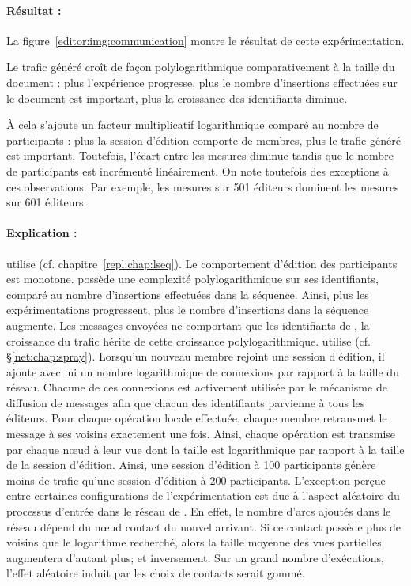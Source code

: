 \paragraph{Résultat :} La figure~\ref{editor:img:communication} montre le
résultat de cette expérimentation.
\begin{inparaenum}[(i)]
\item Le trafic généré croît de façon polylogarithmique comparativement à la
  taille du document : plus l'expérience progresse, plus le nombre d'insertions
  effectuées sur le document est important, plus la croissance des identifiants
  diminue.
\item À cela s'ajoute un facteur multiplicatif logarithmique comparé au nombre
  de participants : plus la session d'édition comporte de membres, plus le
  trafic généré est important. Toutefois, l'écart entre les mesures diminue
  tandis que le nombre de participants est incrémenté linéairement. On note
  toutefois des exceptions à ces observations. Par exemple, les mesures sur 501
  éditeurs dominent les mesures sur 601 éditeurs.
\end{inparaenum}

\paragraph{Explication :} \CRATE utilise \LSEQ
(cf. chapitre~\ref{repl:chap:lseq}). Le comportement d'édition des participants
est monotone. \LSEQ possède une complexité polylogarithmique sur ses
identifiants, comparé au nombre d'insertions effectuées dans la séquence. Ainsi,
plus les expérimentations progressent, plus le nombre d'insertions dans la
séquence augmente. Les messages envoyées ne comportant que les identifiants de
\LSEQ, la croissance du trafic hérite de cette croissance
polylogarithmique. \CRATE utilise \SPRAY (cf. §\ref{net:chap:spray}). Lorsqu'un
nouveau membre rejoint une session d'édition, il ajoute avec lui un nombre
logarithmique de connexions par rapport à la taille du réseau. Chacune de ces
connexions est activement utilisée par le mécanisme de diffusion de messages
afin que chacun des identifiants parvienne à tous les éditeurs. Pour chaque
opération locale effectuée, chaque membre retransmet le message à ses voisins
exactement une fois. Ainsi, chaque opération est transmise par chaque nœud à
leur vue dont la taille est logarithmique par rapport à la taille de la session
d'édition. Ainsi, une session d'édition à 100 participants génère moins de
trafic qu'une session d'édition à 200 participants. L'exception perçue entre
certaines configurations de l'expérimentation est due à l'aspect aléatoire du
processus d'entrée dans le réseau de \SPRAY. En effet, le nombre d'arcs ajoutés
dans le réseau dépend du nœud contact du nouvel arrivant. Si ce contact possède
plus de voisins que le logarithme recherché, alors la taille moyenne des vues
partielles augmentera d'autant plus; et inversement.  Sur un grand nombre
d'exécutions, l'effet aléatoire induit par les choix de contacts serait gommé.



